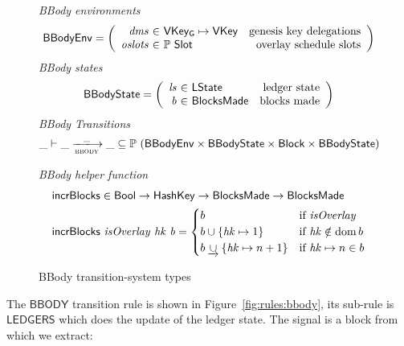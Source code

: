\begin{figure}
  \emph{BBody environments}
  \begin{equation*}
    \BBodyEnv =
    \left(
      \begin{array}{r@{~\in~}lr}
        \var{dms} & \VKeyGen\mapsto\VKey & \text{genesis key delegations} \\
        \var{oslots} & \powerset{\Slot} & \text{overlay schedule slots} \\
      \end{array}
    \right)
  \end{equation*}
  \emph{BBody states}
  \begin{equation*}
    \BBodyState =
    \left(
      \begin{array}{r@{~\in~}lr}
        \var{ls} & \LState & \text{ledger state} \\
        \var{b} & \BlocksMade & \text{blocks made} \\
      \end{array}
    \right)
  \end{equation*}
  \emph{BBody Transitions}
  \begin{equation*}
    \_ \vdash \var{\_} \trans{bbody}{\_} \var{\_} \subseteq
    \powerset (\BBodyEnv \times \BBodyState \times \Block \times \BBodyState)
  \end{equation*}
  \caption{BBody transition-system types}
  \label{fig:ts-types:bbody}
  \emph{BBody helper function}
  \begin{align*}
      & \mathsf{incrBlocks} \in \mathsf{Bool} \to \mathsf{HashKey} \to
          \mathsf{BlocksMade} \to \mathsf{BlocksMade} \\
      & \mathsf{incrBlocks}~\mathit{isOverlay}~\mathit{hk}~\mathit{b} =
        \begin{cases}
          b & \text{if }\mathit{isOverlay} \\
          b\cup\{\mathit{hk}\mapsto 1\} & \text{if }\mathit{hk}\notin\operatorname{dom}{b} \\
          b\mathbin{\underrightarrow\cup}\{\mathit{hk}\mapsto n+1\} & \text{if }\mathit{hk}\mapsto n\in b \\
        \end{cases}
  \end{align*}

\end{figure}

The $\mathsf{BBODY}$ transition rule is shown in Figure~\ref{fig:rules:bbody},
its sub-rule is $\mathsf{LEDGERS}$ which does the update of the ledger
state. The signal is a block from which we extract:


